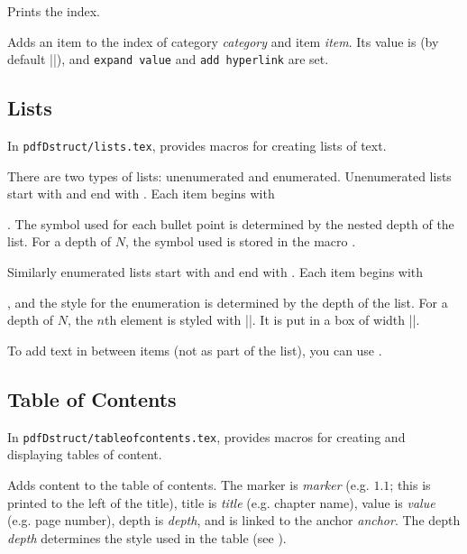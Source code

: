 \macroexp{\index}
Prints the index.
\emacroexp

Adds an item to the index of category {\it category} and item {\it item}.
Its value is \macro\@defaultindexval{} (by default \inlinecode|\the\pageno|), and {\tt expand value} and {\tt add hyperlink} are set.
\emacroexp

\subsection{Lists}

In {\tt pdfDstruct/lists.tex}, \pdftoolbox{} provides macros for creating lists of text.

There are two types of lists: unenumerated and enumerated.
Unenumerated lists start with \macro\blist\anchormacro\blist{} and end with \macro\elist\anchormacro\elist.
Each item begins with \macro\item\anchormacro\item.
The symbol used for each bullet point is determined by the nested depth of the list.
For a depth of $N$, the symbol used is stored in the macro \macro\liststyleN\anchormacro\liststyle.

Similarly enumerated lists start with \macro\benum\anchormacro\benum{} and end with \macro\elist\anchormacro\eenum.
Each item begins with \macro\item, and the style for the enumeration is determined by the depth of the list.
For a depth of $N$, the $n$th element is styled with \inlinecode||.
It is put in a box of width \inlinecode|\enumstyleN@wd|.

To add text in between items (not as part of the list), you can use \macro\mtext\anchormacro\mtext.

\subsection{Table of Contents}

In {\tt pdfDstruct/tableofcontents.tex}, \pdftoolbox{} provides macros for creating and displaying tables of content.

Adds content to the table of contents.
The marker is {\it marker} (e.g. $1.1$; this is printed to the left of the title), title is {\it title} (e.g. chapter name), value is {\it value} (e.g. page number), depth is {\it depth},
and is linked to the anchor {\it anchor}.
The depth {\it depth} determines the style used in the table (see \gotomacro\settocdepthformat).
\emacroexp

